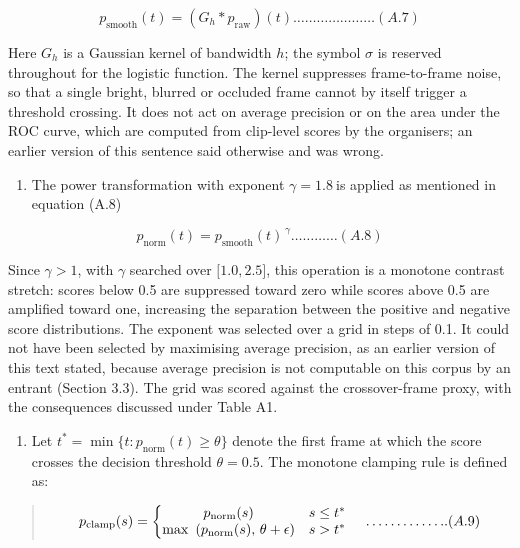 \[p_{\text{smooth}}(t) = \left( G_{h} * p_{\text{raw}} \right)(t)\ldots\ldots\ldots\ldots\ldots\ldots\ldots(A.7)\]

Here \(G_{h}\) is a Gaussian kernel of bandwidth \(h\); the symbol \(\sigma\) is reserved throughout for the logistic function. The kernel suppresses frame-to-frame noise, so that a single bright, blurred or occluded frame cannot by itself trigger a threshold crossing. It does not act on average precision or on the area under the ROC curve, which are computed from clip-level scores by the organisers; an earlier version of this sentence said otherwise and was wrong.

\begin{enumerate}
\def\labelenumi{\arabic{enumi}.}
\setcounter{enumi}{2}
\item
  The power transformation with exponent \(\gamma = 1.8\ \)is applied as mentioned in equation (A.8)
\end{enumerate}

\[p_{\text{norm}}(t) = p_{\text{smooth}}(t)^{\,\gamma}\ldots\ldots\ldots\ldots(A.8)\]

Since \(\gamma > 1\), with \(\gamma\) searched over \(\lbrack 1.0,2.5\rbrack\), this operation is a monotone contrast stretch: scores below 0.5 are suppressed toward zero while scores above 0.5 are amplified toward one, increasing the separation between the positive and negative score distributions. The exponent was selected over a grid in steps of 0.1. It could not have been selected by maximising average precision, as an earlier version of this text stated, because average precision is not computable on this corpus by an entrant (Section 3.3). The grid was scored against the crossover-frame proxy, with the consequences discussed under Table A1.

\begin{enumerate}
\def\labelenumi{\arabic{enumi}.}
\setcounter{enumi}{3}
\item
  Let \(t^{*} = \min\{ t:p_{\text{norm}}(t) \geq \theta\}\) denote the first frame at which the score crosses the decision threshold \(\theta = 0.5\). The monotone clamping rule is defined as:
\end{enumerate}

\begin{quote}
\[\begin{matrix}
 & p_{\text{clamp}}(s) = \left\{ \begin{matrix}
p_{\text{norm}}(s) & s \leq t^{*} \\
\max\text{\,}\left( p_{\text{norm}}(s),\text{\,}\theta + \epsilon \right) & s > t^{*}
\end{matrix} \right.\  & \ldots\ldots\ldots\ldots..(A.9) & 
\end{matrix}\]
\end{quote}

